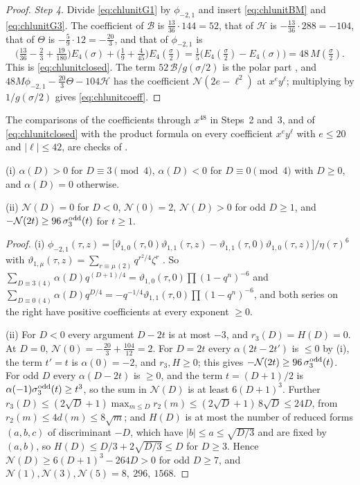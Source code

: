 \begin{proof}
\emph{Step 4.} Divide \eqref{eq:chlunitG1} by $\phi_{-2,1}$ and insert \eqref{eq:chlunitBM} and \eqref{eq:chlunitG3}. The coefficient of $\mathcal B$ is $\tfrac{13}{36}\cdot144=52$, that of $\mathcal H$ is $-\tfrac{13}{36}\cdot288=-104$, that of $\Theta$ is $-\tfrac59\cdot12=-\tfrac{20}3$, and that of $\phi_{-2,1}$ is
\[
\Big(\tfrac{13}{36}-\tfrac23+\tfrac{19}{180}\Big)E_4(\sigma)+\Big(\tfrac19+\tfrac4{45}\Big)E_4(\tfrac\sigma2)=\tfrac15\big(E_4(\tfrac\sigma2)-E_4(\sigma)\big)=48\,M(\tfrac\sigma2).
\]
This is \eqref{eq:chlunitclosed}. The term $52\,\mathcal B/g(\sigma/2)$ is the polar part \cite[(5.45)]{BSS25}, and $48M\phi_{-2,1}-\tfrac{20}3\Theta-104\mathcal H$ has the coefficient $\mathcal N(2e-\ell^2)$ at $x^ey^\ell$; multiplying by $1/g(\sigma/2)$ gives \eqref{eq:chlunitcoeff}.
\end{proof}

The comparisons of the coefficients through $x^{48}$ in Steps~2 and~3, and of \eqref{eq:chlunitclosed} with the product formula on every coefficient $x^ey^\ell$ with $e\le20$ and $|\ell|\le42$, are checks of \cite{Bha26}.

\begin{lemma}\label{lem:chlunitsigns}
\textup{(i)} $\alpha(D)>0$ for $D\equiv3\pmod4$, $\alpha(D)<0$ for $D\equiv0\pmod4$ with $D\ge0$, and $\alpha(D)=0$ otherwise.

\textup{(ii)} $\mathcal N(D)=0$ for $D<0$, $\mathcal N(0)=2$, $\mathcal N(D)>0$ for odd $D\ge1$, and $-\mathcal N(2t)\ge96\,\sigma_3^{\rm odd}(t)$ for $t\ge1$.
\end{lemma}

\begin{proof}
(i) $\phi_{-2,1}(\tau,z)=\big[\vartheta_{1,0}(\tau,0)\vartheta_{1,1}(\tau,z)-\vartheta_{1,1}(\tau,0)\vartheta_{1,0}(\tau,z)\big]/\eta(\tau)^6$ with $\vartheta_{1,\mu}(\tau,z)=\sum_{r\equiv\mu\,(2)}q^{r^2/4}\zeta^r$ \cite[(4.1)]{BringmannMurthy13}. So $\sum_{D\equiv3\,(4)}\alpha(D)q^{(D+1)/4}=\vartheta_{1,0}(\tau,0)\prod(1-q^n)^{-6}$ and $\sum_{D\equiv0\,(4)}\alpha(D)q^{D/4}=-q^{-1/4}\vartheta_{1,1}(\tau,0)\prod(1-q^n)^{-6}$, and both series on the right have positive coefficients at every exponent $\ge0$.

(ii) For $D<0$ every argument $D-2t$ is at most $-3$, and $r_3(D)=H(D)=0$. At $D=0$, $\mathcal N(0)=-\tfrac{20}3+\tfrac{104}{12}=2$. For $D=2t$ every $\alpha(2t-2t')$ is $\le0$ by (i), the term $t'=t$ is $\alpha(0)=-2$, and $r_3,H\ge0$; this gives $-\mathcal N(2t)\ge96\,\sigma_3^{\rm odd}(t)$. For odd $D$ every $\alpha(D-2t)$ is $\ge0$, and the term $t=(D+1)/2$ is $\alpha(-1)\sigma_3^{\rm odd}(t)\ge t^3$, so the sum in $\mathcal N(D)$ is at least $6(D+1)^3$. Further $r_3(D)\le(2\sqrt D+1)\max_{m\le D}r_2(m)\le(2\sqrt D+1)\,8\sqrt D\le24D$, from $r_2(m)\le4d(m)\le8\sqrt m$; and $H(D)$ is at most the number of reduced forms $(a,b,c)$ of discriminant $-D$, which have $|b|\le a\le\sqrt{D/3}$ and are fixed by $(a,b)$, so $H(D)\le D/3+2\sqrt{D/3}\le D$ for $D\ge3$. Hence $\mathcal N(D)\ge6(D+1)^3-264D>0$ for odd $D\ge7$, and $\mathcal N(1),\mathcal N(3),\mathcal N(5)=8,\ 296,\ 1568$.
\end{proof}

